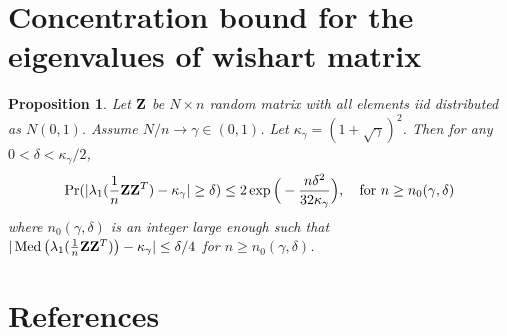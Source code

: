 \documentclass[11pt]{article}
\DeclareMathOperator{\myMed}{Med}
\theoremstyle{plain}
\newtheorem{proposition}{\quad\quad Proposition}
\theoremstyle{definition}
\theoremstyle{remark}
\begin{document}
\section{Concentration bound for the eigenvalues of wishart matrix}
\begin{proposition}
    Let $\mathbf{Z}$ be $N\times n$ random matrix with all elements iid distributed as $N(0,1)$.
    Assume $N/n\to \gamma\in(0,1)$.
    Let $\kappa_{\gamma}=(1+\sqrt{\gamma})^2$.
    Then for any $0< \delta< \kappa_{\gamma}/2$,
    $$
    \Pr(|\lambda_1(\frac{1}{n}\mathbf{Z}\mathbf{Z}^T)-\kappa_{\gamma}|\geq \delta)\leq 2\exp\Big(-\frac{n\delta^2}{32\kappa_{\gamma}}\Big),\quad \text{for $n\geq n_0(\gamma,\delta)$}
    $$
    where $n_0(\gamma,\delta)$ is an integer large enough such that $|\myMed\big(\lambda_1(\frac{1}{n}\BZ\BZ^T)\big)-\kappa_{\gamma}|\leq \delta/4$ for $n\geq n_0(\gamma,\delta)$.
\end{proposition}


\section*{References}




\end{document}
